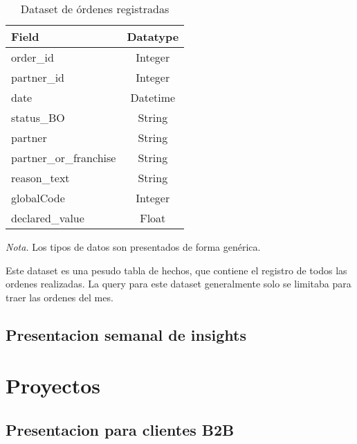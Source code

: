 \begin{table}[htbp]
\caption{Dataset de órdenes registradas}
  \raggedright
	\label{tab:main_dataset}
	\begin{threeparttable}
		\begin{tabular}{lc}
			\toprule
			\textbf{Field}         & \textbf{Datatype} \\
			\midrule
			order\_id              & Integer           \\
			partner\_id            & Integer           \\
			date                   & Datetime          \\
			status\_BO             & String            \\
			partner                & String            \\
			partner\_or\_franchise & String            \\
			reason\_text           & String            \\
			globalCode             & Integer           \\
			declared\_value        & Float             \\
			\bottomrule
		\end{tabular}
		\begin{tablenotes}[para]
			\small
			\textit{Nota.} Los tipos de datos son presentados de forma genérica.
		\end{tablenotes}
	\end{threeparttable}
\end{table}

Este dataset es una pesudo tabla de hechos, que contiene el registro de todos las ordenes realizadas. La query para este dataset generalmente solo se limitaba para traer las ordenes del mes.
\subsection{Presentacion semanal de insights}
\section{Proyectos}
\subsection{Presentacion para clientes B2B}
